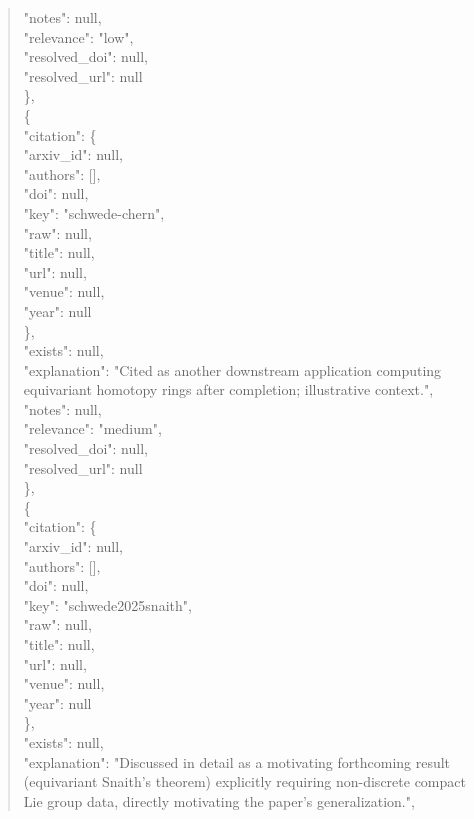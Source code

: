 \documentclass[11pt]{article}
\begin{document}
\begin{quote}
      "notes": null,\\
      "relevance": "low",\\
      "resolved\_doi": null,\\
      "resolved\_url": null\\
    \},\\
    \{\\
      "citation": \{\\
        "arxiv\_id": null,\\
        "authors": [],\\
        "doi": null,\\
        "key": "schwede-chern",\\
        "raw": null,\\
        "title": null,\\
        "url": null,\\
        "venue": null,\\
        "year": null\\
      \},\\
      "exists": null,\\
      "explanation": "Cited as another downstream application computing equivariant homotopy rings after completion; illustrative context.",\\
      "notes": null,\\
      "relevance": "medium",\\
      "resolved\_doi": null,\\
      "resolved\_url": null\\
    \},\\
    \{\\
      "citation": \{\\
        "arxiv\_id": null,\\
        "authors": [],\\
        "doi": null,\\
        "key": "schwede2025snaith",\\
        "raw": null,\\
        "title": null,\\
        "url": null,\\
        "venue": null,\\
        "year": null\\
      \},\\
      "exists": null,\\
      "explanation": "Discussed in detail as a motivating forthcoming result (equivariant Snaith's theorem) explicitly requiring non-discrete compact Lie group data, directly motivating the paper's generalization.",\\

\end{quote}
\end{document}

